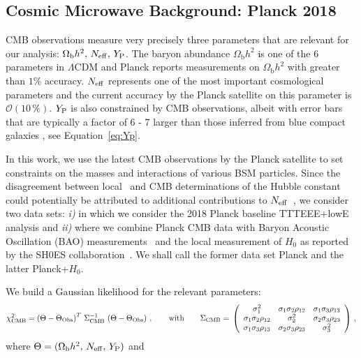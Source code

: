 \subsection{Cosmic Microwave Background: Planck 2018}\label{sec:CMB_data}
CMB observations measure very precisely three parameters that are relevant for our analysis: $\Omega_{\mathrm{b}} h^2,\,N_{\rm eff},\,Y_{\rm P}$. The baryon abundance $\Omega_{\mathrm{b}} h^2$ is one of the 6 parameters in $\Lambda$CDM and Planck reports measurements on $\Omega_{\mathrm{b}} h^2$ with greater than $1\%$ accuracy. $N_{\rm eff}$ represents one of the most important cosmological parameters and the current accuracy by the Planck satellite on this parameter is $\mathcal{O}(10\,\%)$. $Y_{\rm P}$ is also constrained by CMB observations, albeit with error bars that are typically a factor of 6 - 7 larger than those inferred from blue compact galaxies \cite{pdg}, see Equation~\eqref{eq:Yp}.

In this work, we use the latest CMB observations by the Planck satellite to set constraints on the masses and interactions of various BSM particles. Since the disagreement between local~\cite{Riess:2019cxk} and CMB determinations of the Hubble constant~\cite{Aghanim:2018eyx} could potentially be attributed to additional contributions to $N_{\rm eff}$~\cite{Bernal:2016gxb,Verde:2019ivm}, we consider two data sets: \textit{i)} in which we consider the 2018 Planck baseline TTTEEE+lowE analysis and \textit{ii)} where we combine Planck CMB data with Baryon Acoustic Oscillation (BAO) measurements~\cite{Beutler:2011hx,Ross:2014qpa,Alam:2016hwk} and the local measurement of $H_0$ as reported by the SH0ES collaboration~\cite{Riess:2019cxk}. We shall call the former data set Planck and the latter Planck+$H_0$.  

We build a Gaussian likelihood for the relevant parameters:
\begin{align}\label{eq:chi2_CMB}
\chi_{\rm CMB}^2  = \left(\Theta - \Theta_{\rm Obs}\right)^T \,  \Sigma_{\rm CMB}^{-1} \,\left(\Theta - \Theta_{\rm Obs}\right)\, , \qquad \text{with} \qquad \Sigma_{\rm CMB} = \,
 \left(
\begin{array}{ccc}
\sigma_1^2 & \sigma_1 \sigma_2 \rho_{12} & \sigma_1 \sigma_3 \rho_{13}  \\
\sigma_1 \sigma_2 \rho_{12}     & \sigma_2^2 & \sigma_2 \sigma_3 \rho_{23} \\
\sigma_1 \sigma_3 \rho_{13}     & \sigma_2 \sigma_3 \rho_{23}        & \sigma_3^2 \\
\end{array}
\right) \,, 
\end{align}
where $\Theta = (\Omega_{\mathrm{b}} h^2,\,N_{\rm eff},\,Y_{\rm P})$ and

